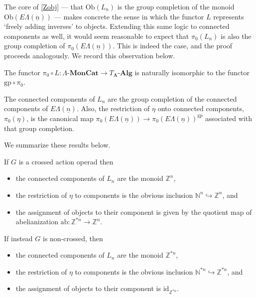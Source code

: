 \documentclass{amsbook} %
\newcommand{\mb}{\mathbf}
\newcommand{\ML}{\mathbf{\Lambda}}
\newcommand{\ELn}{E\Lambda(\underline{n})}
\newcommand{\lmc}{\Lambda\mbox{-}\mb{MonCat}}
\numberwithin{section}{chapter}
\begin{document}
The core of \cref{Zobj} --- that $\mathrm{Ob}(L_n)$ is the group completion of the monoid $\mathrm{Ob}(\ELn)$ --- makes concrete the sense in which the functor $L$ represents `freely adding inverses' to objects. Extending this same logic to connected components as well, it would seem reasonable to expect that $\pi_0(L_n)$ is also the group completion of $\pi_0(\ELn)$. This is indeed the case, and the proof proceeds analogously. We record this observation below. 

\begin{prop}\label{pilel_gppiel}
The functor $\pi_0 \circ L: \lmc \to T_{\ML}\mbox{-}\mb{Alg}$ is naturally isomorphic to the functor $\mathrm{gp} \circ \pi_0$.
\end{prop}

\begin{cor}\label{Zconcomp} The connected components of $L_n$ are the group completion of the connected components of $\ELn$. Also, the restriction of $\eta$ onto connected components, $\pi_0(\eta)$, is the canonical map $\pi_0(\ELn) \to \pi_0(\ELn)^{\mathrm{gp}}$ associated with that group completion.
\end{cor}

We summarize these results below.
\begin{cor}\label{crossconcomp} If $G$ is a crossed action operad then
\begin{itemize} 
\item the connected components of $L_n$ are the monoid $\mathbb{Z}^n$,
\item the restriction of $\eta$ to components is the obvious inclusion $\mathbb{N}^n \hookrightarrow \mathbb{Z}^n$, and
\item the assignment of objects to their component is given by the quotient map of abelianization $\mathrm{ab}: \mathbb{Z}^{\ast n} \to \mathbb{Z}^n$.
\end{itemize}
If instead $G$ is non-crossed, then
\begin{itemize} \itemsep0em
\item the connected components of $L_n$ are the monoid $\mathbb{Z}^{\ast n}$,
\item the restriction of $\eta$ to components is the obvious inclusion $\mathbb{N}^{\ast n} \hookrightarrow \mathbb{Z}^{\ast n}$, and
\item the assignment of objects to their component is $\mathrm{id}_{\mathbb{Z}^{\ast n}}$.
\end{itemize}
\end{cor}
\end{document}
